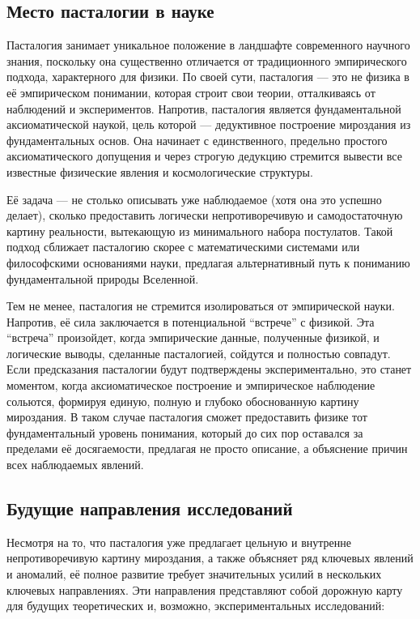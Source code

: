 \documentclass[pdflatex,sn-mathphys-num]{sn-jnl}
\begin{document}
\subsection{Место пасталогии в науке}\label{subsec:place-in-science}

Пасталогия занимает уникальное положение в ландшафте современного научного знания, поскольку она существенно отличается от традиционного эмпирического подхода, характерного для физики. По своей сути, пасталогия --- это не физика в её эмпирическом понимании, которая строит свои теории, отталкиваясь от наблюдений и экспериментов. Напротив, пасталогия является фундаментальной аксиоматической наукой, цель которой --- дедуктивное построение мироздания из фундаментальных основ. Она начинает с единственного, предельно простого аксиоматического допущения и через строгую дедукцию стремится вывести все известные физические явления и космологические структуры.

Её задача --- не столько описывать уже наблюдаемое (хотя она это успешно делает), сколько предоставить логически непротиворечивую и самодостаточную картину реальности, вытекающую из минимального набора постулатов. Такой подход сближает пасталогию скорее с математическими системами или философскими основаниями науки, предлагая альтернативный путь к пониманию фундаментальной природы Вселенной.

Тем не менее, пасталогия не стремится изолироваться от эмпирической науки. Напротив, её сила заключается в потенциальной ``встрече'' с физикой. Эта ``встреча'' произойдет, когда эмпирические данные, полученные физикой, и логические выводы, сделанные пасталогией, сойдутся и полностью совпадут. Если предсказания пасталогии будут подтверждены экспериментально, это станет моментом, когда аксиоматическое построение и эмпирическое наблюдение сольются, формируя единую, полную и глубоко обоснованную картину мироздания. В таком случае пасталогия сможет предоставить физике тот фундаментальный уровень понимания, который до сих пор оставался за пределами её досягаемости, предлагая не просто описание, а объяснение причин всех наблюдаемых явлений.

\subsection{Будущие направления исследований}\label{subsec:future-directions}

Несмотря на то, что пасталогия уже предлагает цельную и внутренне непротиворечивую картину мироздания, а также объясняет ряд ключевых явлений и аномалий, её полное развитие требует значительных усилий в нескольких ключевых направлениях. Эти направления представляют собой дорожную карту для будущих теоретических и, возможно, экспериментальных исследований:
\end{document}
